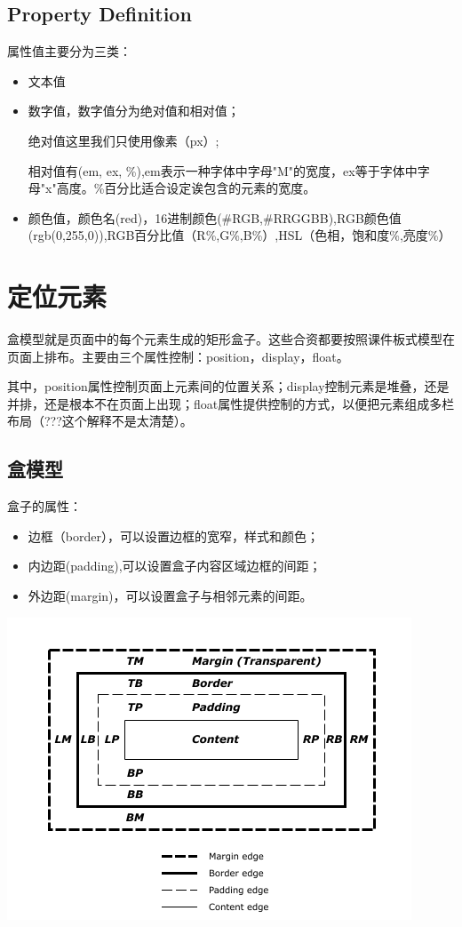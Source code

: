 \subsection{Property Definition}



属性值主要分为三类：

\begin{itemize}
\item 文本值
\item 数字值，数字值分为绝对值和相对值；

绝对值这里我们只使用像素（px）;

相对值有(em, ex, \%),em表示一种字体中字母"M"的宽度，ex等于字体中字母"x"高度。\%百分比适合设定诶包含的元素的宽度。

\item 颜色值，颜色名(red)，16进制颜色(\#RGB,\#RRGGBB),RGB颜色值(rgb(0,255,0)),RGB百分比值（R\%,G\%,B\%）,HSL（色相，饱和度\%,亮度\%）
\end{itemize}


\section{定位元素}

盒模型就是页面中的每个元素生成的矩形盒子。这些合资都要按照课件板式模型在页面上排布。主要由三个属性控制：position，display，float。

其中，position属性控制页面上元素间的位置关系；display控制元素是堆叠，还是并排，还是根本不在页面上出现；float属性提供控制的方式，以便把元素组成多栏布局（???这个解释不是太清楚）。

\subsection{盒模型}

盒子的属性：
\begin{itemize}
\item 边框（border），可以设置边框的宽窄，样式和颜色；
\item 内边距(padding),可以设置盒子内容区域边框的间距；
\item 外边距(margin)，可以设置盒子与相邻元素的间距。
\end{itemize}

\includegraphics[scale=1]{css/resources/box-mode.png}



